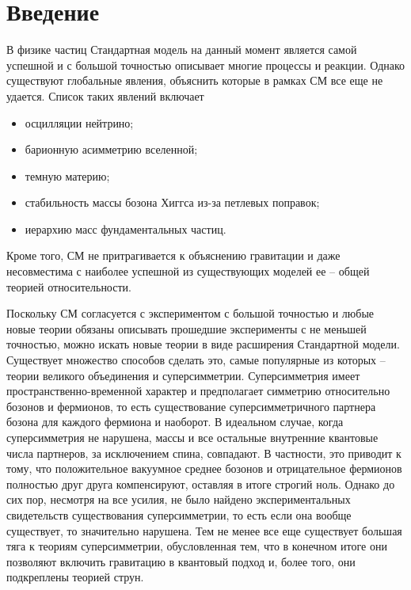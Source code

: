 \documentclass[a4paper, 10pt, twocolumn]{article}
\begin{document}

\section{Введение}

В физике частиц Стандартная модель на данный момент является 
самой успешной и с большой точностью описывает многие процессы 
и реакции. Однако существуют глобальные явления, объяснить 
которые в рамках СМ все еще не удается. Список таких явлений 
включает
\begin{itemize}
	\item осцилляции нейтрино;
	\item барионную асимметрию вселенной;
	\item темную материю;
	\item стабильность массы бозона Хиггса из-за петлевых поправок;
	\item иерархию масс фундаментальных частиц.
\end{itemize}
Кроме того, СМ не притрагивается к объяснению гравитации и даже 
несовместима с наиболее успешной из существующих моделей ее -- общей 
теорией относительности.

Поскольку СМ согласуется с экспериментом с большой точностью и любые 
новые теории обязаны описывать прошедшие эксперименты с не меньшей 
точностью, можно искать новые теории в виде расширения Стандартной 
модели. Существует множество способов сделать это, самые популярные из 
которых -- теории великого объединения и суперсимметрии. Суперсимметрия 
имеет пространственно-временной характер и предполагает симметрию 
относительно бозонов и фермионов, то есть существование 
суперсимметричного партнера бозона для каждого фермиона и наоборот. 
В идеальном случае, когда суперсимметрия не нарушена, массы и все 
остальные внутренние квантовые числа партнеров, за исключением спина, 
совпадают. В частности, это приводит к тому, что положительное 
вакуумное среднее бозонов и отрицательное фермионов полностью друг 
друга компенсируют, оставляя в итоге строгий ноль. Однако до сих пор, 
несмотря на все усилия, не было найдено экспериментальных свидетельств 
существования суперсимметрии, то есть если она вообще существует, то 
значительно нарушена. Тем не менее все еще существует большая тяга 
к теориям суперсимметрии, обусловленная тем, что в конечном итоге они 
позволяют включить гравитацию в квантовый подход и, более того, они 
подкреплены теорией струн.
\end{document}
